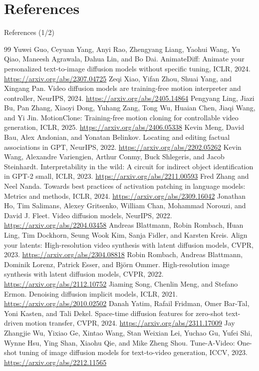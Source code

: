 \documentclass[aspectratio=169,11pt]{beamer}
\begin{document}
\section*{References}
\begin{frame}{References (1/2)}
  \tiny\vspace*{-3mm}
  \begin{thebibliography}{99}\setlength{\itemsep}{0pt}
   Yuwei Guo, Ceyuan Yang, Anyi Rao, Zhengyang Liang, Yaohui Wang, Yu Qiao, Maneesh Agrawala, Dahua Lin, and Bo Dai. AnimateDiff: Animate your personalized text-to-image diffusion models without specific tuning, ICLR, 2024. \url{https://arxiv.org/abs/2307.04725}
   Zeqi Xiao, Yifan Zhou, Shuai Yang, and Xingang Pan. Video diffusion models are training-free motion interpreter and controller, NeurIPS, 2024. \url{https://arxiv.org/abs/2405.14864}
   Pengyang Ling, Jiazi Bu, Pan Zhang, Xiaoyi Dong, Yuhang Zang, Tong Wu, Huaian Chen, Jiaqi Wang, and Yi Jin. MotionClone: Training-free motion cloning for controllable video generation, ICLR, 2025. \url{https://arxiv.org/abs/2406.05338}
   Kevin Meng, David Bau, Alex Andonian, and Yonatan Belinkov. Locating and editing factual associations in GPT, NeurIPS, 2022. \url{https://arxiv.org/abs/2202.05262}
   Kevin Wang, Alexandre Variengien, Arthur Conmy, Buck Shlegeris, and Jacob Steinhardt. Interpretability in the wild: A circuit for indirect object identification in GPT-2 small, ICLR, 2023. \url{https://arxiv.org/abs/2211.00593}
   Fred Zhang and Neel Nanda. Towards best practices of activation patching in language models: Metrics and methods, ICLR, 2024. \url{https://arxiv.org/abs/2309.16042}
   Jonathan Ho, Tim Salimans, Alexey Gritsenko, William Chan, Mohammad Norouzi, and David J. Fleet. Video diffusion models, NeurIPS, 2022. \url{https://arxiv.org/abs/2204.03458}
   Andreas Blattmann, Robin Rombach, Huan Ling, Tim Dockhorn, Seung Wook Kim, Sanja Fidler, and Karsten Kreis. Align your latents: High-resolution video synthesis with latent diffusion models, CVPR, 2023. \url{https://arxiv.org/abs/2304.08818}
   Robin Rombach, Andreas Blattmann, Dominik Lorenz, Patrick Esser, and Bj\"orn Ommer. High-resolution image synthesis with latent diffusion models, CVPR, 2022. \url{https://arxiv.org/abs/2112.10752}
   Jiaming Song, Chenlin Meng, and Stefano Ermon. Denoising diffusion implicit models, ICLR, 2021. \url{https://arxiv.org/abs/2010.02502}
   Danah Yatim, Rafail Fridman, Omer Bar-Tal, Yoni Kasten, and Tali Dekel. Space-time diffusion features for zero-shot text-driven motion transfer, CVPR, 2024. \url{https://arxiv.org/abs/2311.17009}
   Jay Zhangjie Wu, Yixiao Ge, Xintao Wang, Stan Weixian Lei, Yuchao Gu, Yufei Shi, Wynne Hsu, Ying Shan, Xiaohu Qie, and Mike Zheng Shou. Tune-A-Video: One-shot tuning of image diffusion models for text-to-video generation, ICCV, 2023. \url{https://arxiv.org/abs/2212.11565}
  \end{thebibliography}
\end{frame}
\end{document}
